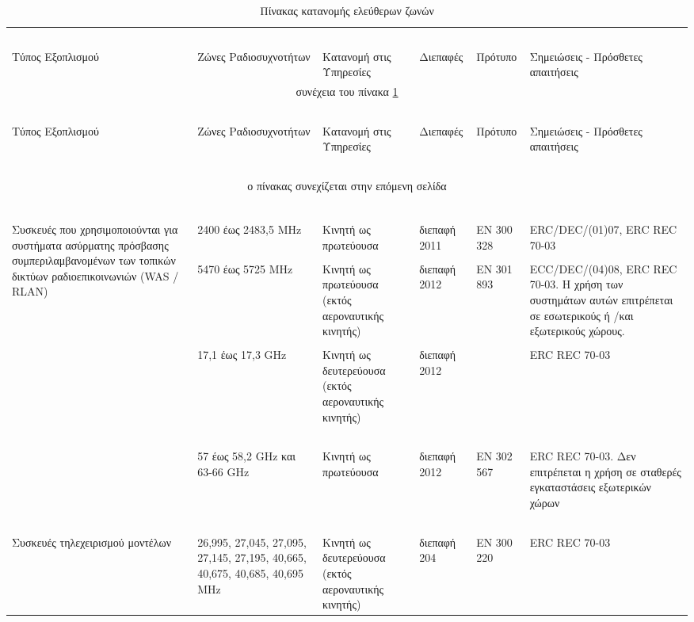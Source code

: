 \documentclass[a4paper, 12pt, twoside]{report}
\begin{document}
{{{{{{\begin{landscape}
			\begin{longtable} { m{3cm} m{2cm} m{4cm} m{1.5cm} m{2cm} m{4cm} }
					\caption[Πίνακας κατανομής ελεύθερων ζωνών \cite{ΦΕΚ2006Β399, ΦΕΚ2011Β2512}]{Πίνακας κατανομής ελεύθερων ζωνών}
					\label{πιν.:Πίνακας κατανομής ελεύθερων ζωνών}\\
					\hline
					~\\
					Τύπος Εξοπλισμού & Ζώνες Ραδιοσυχνοτήτων & Κατανομή στις Υπηρεσίες & Διεπαφές & Πρότυπο & Σημειώσεις - Πρόσθετες απαιτήσεις\\
					\hline
					\endfirsthead
					\multicolumn{6}{c}{συνέχεια του πίνακα \ref{πιν.:Πίνακας κατανομής ελεύθερων ζωνών}}\\
					\hline
					~\\
					Τύπος Εξοπλισμού & Ζώνες Ραδιοσυχνοτήτων & Κατανομή στις Υπηρεσίες & Διεπαφές & Πρότυπο & Σημειώσεις - Πρόσθετες απαιτήσεις\\
					\hline
					~\\
					\endhead
					\hline
					\multicolumn{6}{c}{ο πίνακας συνεχίζεται στην επόμενη σελίδα}\\
					\endfoot
					\multicolumn{6}{c}{ολοκληρώθηκε ο πίνακας \ref{πιν.:Πίνακας κατανομής ελεύθερων ζωνών}}\\
					\endlastfoot
					~\\
					\multirow{4}{*}{\parbox{3cm}{Συσκευές που χρησιμοποιούνται για συστήματα ασύρματης πρόσβασης συμπεριλαμβανομένων των τοπικών δικτύων ραδιοεπικοινωνιών (WAS / RLAN)}} & 2400 έως 2483,5 MHz & Κινητή ως πρωτεύουσα & διεπαφή 2011 & EN 300 328 & ERC/DEC/(01)07, ERC REC 70-03\\
					\cline{2-6}
					~\\
					& 5470 έως 5725 ΜΗz & Κινητή ως πρωτεύουσα (εκτός αεροναυτικής κινητής) & διεπαφή 2012 & EN 301 893 & ECC/DEC/(04)08, ERC REC 70-03. Η χρήση των συστημάτων αυτών επιτρέπεται σε εσωτερικούς ή /και εξωτερικούς χώρους.\\
					\cline{2-6}
					~\\
					& 17,1 έως 17,3 GHz & Κινητή ως δευτερεύουσα (εκτός αεροναυτικής κινητής) & διεπαφή 2012 & & ERC REC 70-03\\
					\cline{2-6}
					~\\
					& 57 έως 58,2 GHz και 63-66 GHz & Κινητή ως πρωτεύουσα & διεπαφή 2012 & EN 302 567 & ERC REC 70-03. Δεν επιτρέπεται η χρήση σε σταθερές εγκαταστάσεις εξωτερικών χώρων\\
					\hdashline
					~\\
					Συσκευές τηλεχειρισμού μοντέλων & 26,995, 27,045, 27,095, 27,145, 27,195, 40,665, 40,675, 40,685, 40,695 MHz & Κινητή ως δευτερεύουσα (εκτός αεροναυτικής κινητής) & διεπαφή 204 & EN 300 220 & ERC REC 70-03\\

\end{longtable}
\end{landscape}}}}}}}
\end{document}
